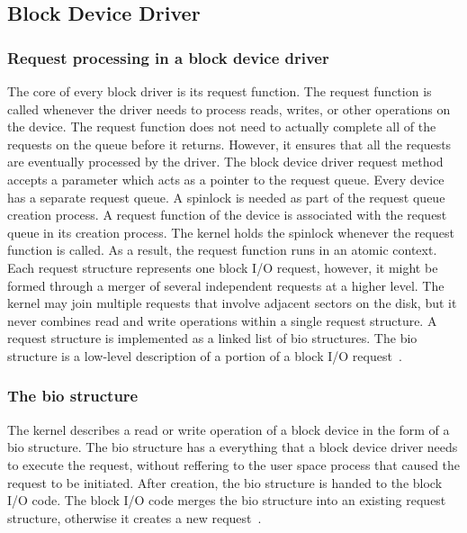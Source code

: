 \subsection{Block Device Driver}
\subsubsection*{Request processing in a block device driver}
\label{subsec:request queue}
The core of every block driver is its request function. The request function is called whenever the driver needs to process reads, writes, or other operations on the device. The request function does not need to actually complete all of the requests on the queue before it returns. However, it ensures that all the requests are eventually processed by the driver. The block device driver request method accepts a parameter which acts as a pointer to the request queue. Every device has a separate request queue. A spinlock is needed as part of the request queue creation process. A request function of the device is associated with the request queue in its creation process. The kernel holds the spinlock whenever the request function is called. As a result, the request function runs in an atomic context.
\\[3mm]
Each request structure represents one block I/O request, however, it might be formed through a merger of several independent requests at a higher level.
The kernel may join multiple requests that involve adjacent sectors on the disk, but it never combines read and write operations within a single request structure. A request structure is implemented as a linked list of bio structures. The bio structure is a low-level description of a portion of a block I/O request~\cite{Corbet:2005:LDD:1209083}.

\subsubsection*{The bio structure}
The kernel describes a read or write operation of a block device in the form of a bio structure. The bio structure has a everything that a block device driver needs to execute the request, without reffering to the user space process that caused the request to be initiated. After creation, the bio structure is handed to the block I/O code. The block I/O code merges the bio structure into an existing request structure, otherwise it creates a new request~\cite{Corbet:2005:LDD:1209083}. 

